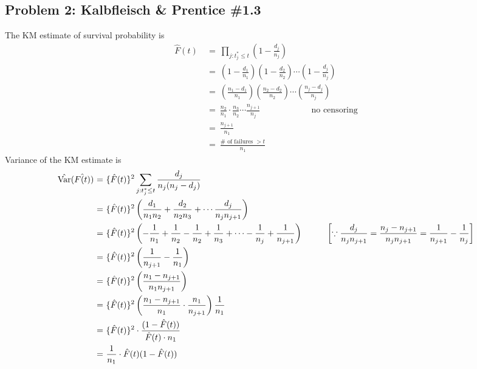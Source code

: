 \documentclass[11pt]{extarticle} %
\newcommand{\Var}{\operatorname{Var}}
\begin{document}
\subsection*{Problem 2: Kalbfleisch \& Prentice \#1.3}
\noindent
The KM estimate of survival probability is
\begin{align*}
\hat{F}(t)\ &{=}\ \prod_{j: t_j^* \leq t} \left(1 - \frac{d_j}{n_j} \right) \\
&{=}\ \left(1 - \frac{d_1}{n_1} \right)\left(1 - \frac{d_2}{n_2} \right)\cdots \left(1 - \frac{d_j}{n_j} \right) \\
&{=}\ \left(\frac{n_1 - d_1}{n_1} \right)\left(\frac{n_2 - d_2}{n_2} \right)\cdots \left(\frac{n_j - d_j}{n_j} \right) \\
&{=}\ \frac{n_2}{n_1} \cdot \frac{n_3}{n_2} \cdots \frac{n_{j+1}}{n_j} \hspace{1in} \text{no censoring} \\
&{=}\ \frac{n_{j+1}}{n_1} \\
&{=}\ \frac{\# \text{ of failures } > t}{n_1}
\end{align*}
Variance of the KM estimate is
\begin{align*}
\hat{\Var}(\hat{F(t)}) \ &{=}\ \{\hat{F}(t)\}^2 \sum_{j: t_j^* \leq t} \frac{d_j}{n_j(n_j - d_j)} \\
&{=}\ \{\hat{F}(t)\}^2\left(\frac{d_1}{n_1 n_2} + \frac{d_2}{n_2 n_3} + \cdots \frac{d_j}{n_j n_{j+1}}\right) \\
&{=}\ \{\hat{F}(t)\}^2\left(-\frac{1}{n_1} + \frac{1}{n_2} -\frac{1}{n_2} + \frac{1}{n_3} + \cdots  -\frac{1}{n_j} + \frac{1}{n_{j+1}}\right) \hspace{0.4in} \left[ \because \frac{d_j}{n_jn_{j+1}} = \frac{n_j - n_{j+1}}{n_jn_{j+1}} = \frac{1}{n_{j+1}} - \frac{1}{n_j} \right] \\
&{=}\ \{\hat{F}(t)\}^2 \left( \frac{1}{n_{j+1}} - \frac{1}{n_1}   \right) \\
&{=}\ \{\hat{F}(t)\}^2 \left( \frac{n_1 - n_{j+1}}{n_1n_{j+1}}   \right) \\
&{=}\ \{\hat{F}(t)\}^2 \left( \frac{n_1 - n_{j+1}}{n_1} \cdot \frac{n_1}{n_{j+1}}   \right)\frac{1}{n_1} \\
&{=}\ \{\hat{F}(t)\}^2 \cdot \frac{(1 - \hat{F}(t))}{\hat{F}(t)\cdot n_1} \\
&{=}\ \frac{1}{n_1}\cdot \hat{F}(t) (1 - \hat{F}(t))
\end{align*}
\end{document}
